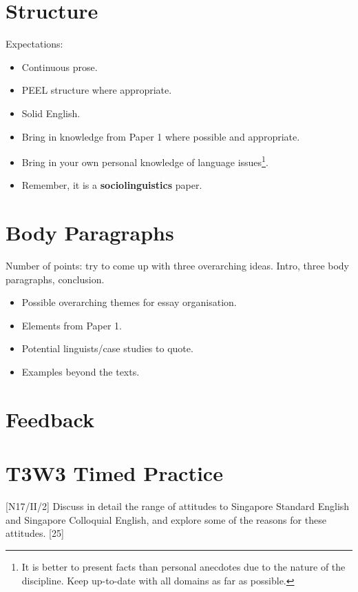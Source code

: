 \documentclass[../main.tex]{subfiles}
\begin{document}
    \section{Structure}
    Expectations:
    \begin{itemize}
        \item Continuous prose.
        \item PEEL structure where appropriate.
        \item Solid English.
        \item Bring in knowledge from Paper 1 where possible and appropriate.
        \item Bring in your own personal knowledge of language issues\footnote{It is better to present facts than personal anecdotes due to the nature of the discipline. Keep up-to-date with all domains as far as possible.}.
        \item Remember, it is a \textbf{sociolinguistics} paper.
    \end{itemize}
    
    \section{Body Paragraphs}
        Number of points: try to come up with three overarching ideas. Intro, three body paragraphs, conclusion. 
        \begin{itemize}
            \item Possible overarching themes for essay organisation.
            \item Elements from Paper 1.
            \item Potential linguists/case studies to quote.
            \item Examples beyond the texts.
        \end{itemize}

    \section{Feedback}
        \section*{T3W3 Timed Practice}
        [N17/II/2] Discuss in detail the range of attitudes to Singapore Standard English and Singapore Colloquial English, and explore some of the reasons for these attitudes. \hfill [25]
\end{document}
